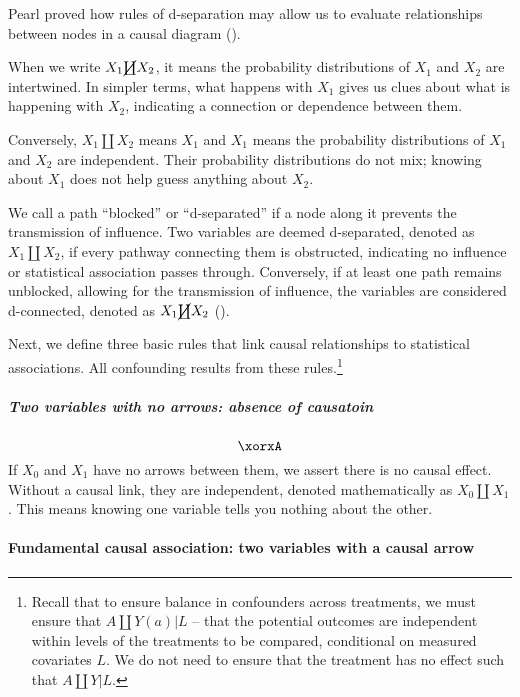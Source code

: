 \documentclass[
  singlecolumn]{article}
\let\oldparagraph\paragraph
\renewcommand{\paragraph}[1]{\oldparagraph{#1}\mbox{}}
\let\oldsubparagraph\subparagraph
\renewcommand{\subparagraph}[1]{\oldsubparagraph{#1}\mbox{}}
\begin{document}
Pearl proved how rules of d-separation may allow us to evaluate
relationships between nodes in a causal diagram
().

When we write \(X_1 \cancel\coprod X_2\), it means the probability
distributions of \(X_1\) and \(X_2\) are intertwined. In simpler terms,
what happens with \(X_1\) gives us clues about what is happening with
\(X_2\), indicating a connection or dependence between them.

Conversely, \(X_1 \coprod X_2\) means \(X_1\) and \(X_1\) means the
probability distributions of \(X_1\) and \(X_2\) are independent. Their
probability distributions do not mix; knowing about \(X_1\) does not
help guess anything about \(X_2\).

We call a path ``blocked'' or ``d-separated'' if a node along it
prevents the transmission of influence. Two variables are deemed
d-separated, denoted as \(X_1 \coprod X_2\), if every pathway connecting
them is obstructed, indicating no influence or statistical association
passes through. Conversely, if at least one path remains unblocked,
allowing for the transmission of influence, the variables are considered
d-connected, denoted as \(X_1 \cancel\coprod X_2\)
().

Next, we define three basic rules that link causal relationships to
statistical associations. All confounding results from these
rules.\footnote{Recall that to ensure balance in confounders across
  treatments, we must ensure that \(A\coprod Y(a)|L\) -- that the
  potential outcomes are independent within levels of the treatments to
  be compared, conditional on measured covariates \(L\). We do not need
  to ensure that the treatment has no effect such that
  \(A\coprod Y |L\).}

\subparagraph{Two variables with no arrows: absence of
causatoin}\label{two-variables-with-no-arrows-absence-of-causatoin}

\[\xorxA\] If \(X_0\) and \(X_1\) have no arrows between them, we assert
there is no causal effect. Without a causal link, they are independent,
denoted mathematically as \(X_0 \coprod X_1\). This means knowing one
variable tells you nothing about the other.

\paragraph{Fundamental causal association: two variables with a causal
arrow}\label{fundamental-causal-association-two-variables-with-a-causal-arrow}
\end{document}
